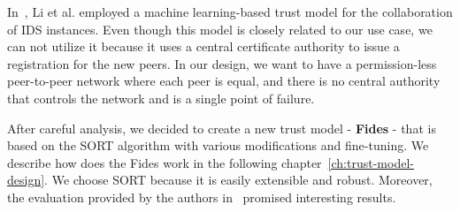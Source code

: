 In~\cite{li2014design}, Li et al. employed a machine learning-based trust model for the collaboration of IDS instances.
Even though this model is closely related to our use case, we can not utilize it because it uses a central certificate authority to issue a registration for the new peers. 
In our design, we want to have a permission-less peer-to-peer network where each peer is equal, and there is no central authority that controls the network and is a single point of failure.

\vspace{1cm}

\noindent
After careful analysis, we decided to create a new trust model - \textbf{Fides} - that is based on the SORT algorithm with various modifications and fine-tuning.
We describe how does the Fides work in the following chapter~\ref{ch:trust-model-design}.
We choose SORT because it is easily extensible and robust. 
Moreover, the evaluation provided by the authors in~\cite{sort} promised interesting results.